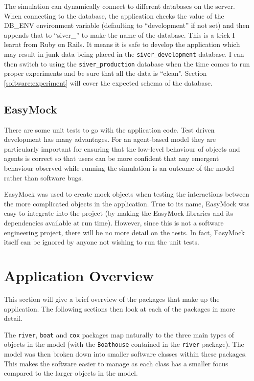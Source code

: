   The simulation can dynamically connect to different databases on the server. When connecting to the
  database, the application checks the value of the DB\_ENV
  environment variable (defaulting to ``development'' if not set) and then appends that to ``siver\_'' to make the
  name of the database. This is a trick I learnt from Ruby on
  Rails. It means it is safe to develop the application which may result
  in junk data being placed in the \texttt{siver\_development} database. I can then switch to using the \texttt{siver\_production} database when the
  time comes to run proper experiments and be sure that
  all the data is ``clean''. Section \ref{software:experiment} will
  cover the expected schema of the database.


  \subsection{EasyMock}
  There are some unit tests to go with the application code. Test driven development has many advantages. 
  For an agent-based model they are particularly important for ensuring
  that the low-level behaviour of objects and agents is correct so that
  users can be more confident that any emergent behaviour observed while running the
  simulation is an outcome of the model rather than software
  bugs.

  EasyMock was used to create mock objects when testing the
  interactions between the more complicated objects in the
  application. True to its name, EasyMock was easy to integrate
  into the project (by making the EasyMock libraries and its dependencies
  available at run time). However, since this is not a software
  engineering project, there will be no more detail on the tests. In
  fact, EasyMock itself can be ignored by anyone not wishing to run
  the unit tests.

\section{Application Overview}
This section will give a brief overview of the packages that make up
the application. The following sections then look at each of the
packages in more detail. 

The \texttt{river}, \texttt{boat} and \texttt{cox} packages map
naturally to the three main types of objects in the model (with the
\texttt{Boathouse} contained in the \texttt{river} package). The model was
then broken down into smaller software classes within these packages. This
makes the software easier to manage as each class has a smaller focus
compared to the larger objects in the model.


